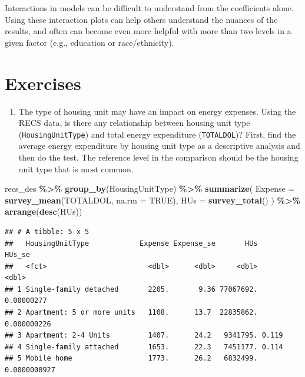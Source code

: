 \documentclass[
]{krantz}
\makeatletter
\newenvironment{Shaded}{\begin{snugshade}}{\end{snugshade}}
\newcommand{\AttributeTok}[1]{\textcolor[rgb]{0.27,0.27,0.27}{#1}}
\newcommand{\ConstantTok}[1]{\textcolor[rgb]{0.37,0.37,0.37}{#1}}
\newcommand{\FunctionTok}[1]{\textcolor[rgb]{0.27,0.27,0.27}{\textbf{#1}}}
\newcommand{\NormalTok}[1]{#1}
\newcommand{\SpecialCharTok}[1]{\textcolor[rgb]{0.43,0.43,0.43}{\textbf{#1}}}
\providecommand{\tightlist}{%
  \setlength{\itemsep}{0pt}\setlength{\parskip}{0pt}}
\newenvironment{kframe}{%
\medskip{}
\setlength{\fboxsep}{.8em}
 \def\at@end@of@kframe{}%
 \ifinner\ifhmode%
  \def\at@end@of@kframe{\end{minipage}}%
  \begin{minipage}{\columnwidth}%
 \fi\fi%
 \def\FrameCommand##1{\hskip\@totalleftmargin \hskip-\fboxsep
 \colorbox{shadecolor}{##1}\hskip-\fboxsep
     \hskip-\linewidth \hskip-\@totalleftmargin \hskip\columnwidth}%
 \MakeFramed {\advance\hsize-\width
   \@totalleftmargin\z@ \linewidth\hsize
   \@setminipage}}%
 {\par\unskip\endMakeFramed%
 \at@end@of@kframe}
\renewenvironment{Shaded}{\begin{kframe}}{\end{kframe}}
\makeatother
\begin{document}
Interactions in models can be difficult to understand from the coefficients alone. Using these interaction plots can help others understand the nuances of the results, and often can become even more helpful with more than two levels in a given factor (e.g., education or race/ethnicity).

\hypertarget{exercises-1}{%
\section{Exercises}\label{exercises-1}}

\begin{enumerate}
\def\labelenumi{\arabic{enumi}.}
\tightlist
\item
  The type of housing unit may have an impact on energy expenses. Using the RECS data, is there any relationship between housing unit type (\texttt{HousingUnitType}) and total energy expenditure (\texttt{TOTALDOL})? First, find the average energy expenditure by housing unit type as a descriptive analysis and then do the test. The reference level in the comparison should be the housing unit type that is most common.
\end{enumerate}

\begin{Shaded}
\begin{Highlighting}[]
\NormalTok{recs\_des }\SpecialCharTok{\%\textgreater{}\%}
  \FunctionTok{group\_by}\NormalTok{(HousingUnitType) }\SpecialCharTok{\%\textgreater{}\%}
  \FunctionTok{summarize}\NormalTok{(}
    \AttributeTok{Expense =} \FunctionTok{survey\_mean}\NormalTok{(TOTALDOL, }\AttributeTok{na.rm =} \ConstantTok{TRUE}\NormalTok{),}
    \AttributeTok{HUs =} \FunctionTok{survey\_total}\NormalTok{()}
\NormalTok{  ) }\SpecialCharTok{\%\textgreater{}\%}
  \FunctionTok{arrange}\NormalTok{(}\FunctionTok{desc}\NormalTok{(HUs))}
\end{Highlighting}
\end{Shaded}

\begin{verbatim}
## # A tibble: 5 x 5
##   HousingUnitType            Expense Expense_se       HUs       HUs_se
##   <fct>                        <dbl>      <dbl>     <dbl>        <dbl>
## 1 Single-family detached       2205.       9.36 77067692. 0.00000277  
## 2 Apartment: 5 or more units   1108.      13.7  22835862. 0.000000226 
## 3 Apartment: 2-4 Units         1407.      24.2   9341795. 0.119       
## 4 Single-family attached       1653.      22.3   7451177. 0.114       
## 5 Mobile home                  1773.      26.2   6832499. 0.0000000927
\end{verbatim}
\end{document}
